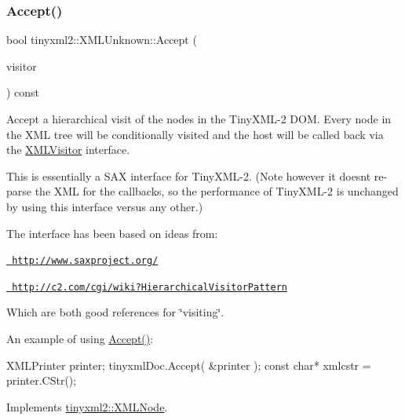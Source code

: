 \subsubsection{\texorpdfstring{Accept()}{Accept()}}
{\footnotesize\ttfamily bool tinyxml2\+::\+X\+M\+L\+Unknown\+::\+Accept (\begin{DoxyParamCaption}\item[{\mbox{\hyperlink{classtinyxml2_1_1_x_m_l_visitor}{X\+M\+L\+Visitor}} $\ast$}]{visitor }\end{DoxyParamCaption}) const\hspace{0.3cm}{\ttfamily [virtual]}}

Accept a hierarchical visit of the nodes in the Tiny\+X\+M\+L-\/2 D\+OM. Every node in the X\+ML tree will be conditionally visited and the host will be called back via the \mbox{\hyperlink{classtinyxml2_1_1_x_m_l_visitor}{X\+M\+L\+Visitor}} interface.

This is essentially a S\+AX interface for Tiny\+X\+M\+L-\/2. (Note however it doesn\textquotesingle{}t re-\/parse the X\+ML for the callbacks, so the performance of Tiny\+X\+M\+L-\/2 is unchanged by using this interface versus any other.)

The interface has been based on ideas from\+:


\begin{DoxyItemize}
\item \href{http://www.saxproject.org/}{\texttt{ http\+://www.\+saxproject.\+org/}}
\item \href{http://c2.com/cgi/wiki?HierarchicalVisitorPattern}{\texttt{ http\+://c2.\+com/cgi/wiki?\+Hierarchical\+Visitor\+Pattern}}
\end{DoxyItemize}

Which are both good references for \char`\"{}visiting\char`\"{}.

An example of using \mbox{\hyperlink{classtinyxml2_1_1_x_m_l_unknown_a8a06b8c82117ca969a432e17a46830fc}{Accept()}}\+: \begin{DoxyVerb}XMLPrinter printer;
tinyxmlDoc.Accept( &printer );
const char* xmlcstr = printer.CStr();
\end{DoxyVerb}
 

Implements \mbox{\hyperlink{classtinyxml2_1_1_x_m_l_node_a81e66df0a44c67a7af17f3b77a152785}{tinyxml2\+::\+X\+M\+L\+Node}}.

\mbox{\label{classtinyxml2_1_1_x_m_l_unknown_ab73b48b819aa4b2ef3815dc2d7d20d5f}} 

